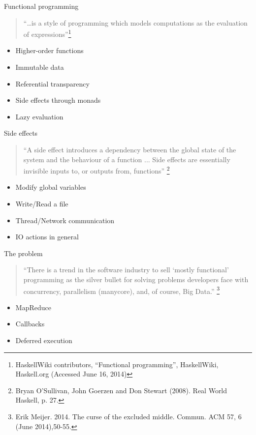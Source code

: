 \documentclass[rail]{beamer}
\begin{document}
\begin{frame}{Functional programming}
  \begin{quote}
    ``\dots is a style of programming which models computations as the
    evaluation of expressions''\footnote[frame,1]
    {HaskellWiki contributors, ``Functional programming'',
      HaskellWiki, Haskell.org (Accessed June 16, 2014)}
  \end{quote}
  \begin{itemize}[<+->]
  \item Higher-order functions
  \item Immutable data
  \item Referential transparency
  \item Side effects through monads
  \item Lazy evaluation
  \end{itemize}
\end{frame}

\begin{frame}{Side effects}
  \begin{quote}
    ``A side effect introduces a dependency between the global state of
    the system and the behaviour of a function ... Side effects are
    essentially invisible inputs to, or outputs from, functions''
    \footnote[frame,1] {Bryan O’Sullivan, John Goerzen and Don Stewart
      (2008). Real World Haskell, p. 27.}
  \end{quote}
  \pause
  \begin{itemize}[<+->]
  \item Modify global variables
  \item Write/Read a file
  \item Thread/Network communication
  \item IO actions in general
  \end{itemize}

\end{frame}

\begin{frame}{The problem}
  \begin{quote}
    ``There is a trend in the software industry to sell `mostly
    functional' programming as the silver bullet for solving problems
    developers face with concurrency, parallelism (manycore), and, of
    course, Big Data.''
    \footnote[frame,1] {Erik Meijer. 2014. The curse of the
      excluded middle. Commun. ACM 57, 6 (June 2014),50-55.}
  \end{quote}
  \pause
  \begin{itemize}[<+->]
  \item MapReduce
  \item Callbacks
  \item Deferred execution
  \end{itemize}
\end{frame}
\end{document}
